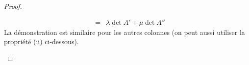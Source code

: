 \documentclass[class=report,crop=false]{standalone}
\begin{document}
\begin{proof}
\begin{itemize}
{\begin{eqnarray*}
&=& \lambda \det A' + \mu \det A''
\end{eqnarray*}
}
La démonstration est similaire pour les autres colonnes
(on peut aussi utiliser la propriété (ii) ci-dessous).
%
%

\end{itemize}
\end{proof}
\end{document}
